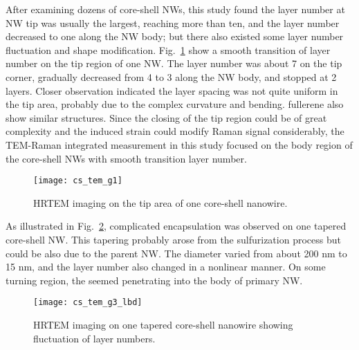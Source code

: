 After examining dozens of core-shell NWs, this study found the  layer number at NW tip was usually the largest, reaching more than ten, and the layer number decreased to one along the NW body; but there also existed some layer number fluctuation and shape modification. Fig.~\ref{fig:ch5ws2tem3} show a smooth transition of  layer number on the tip region of one NW. The layer number was about 7 on the tip corner, gradually decreased from 4 to 3 along the NW body, and stopped at 2 layers. Closer observation indicated the layer spacing was not quite uniform in the tip area, probably due to the complex curvature and bending.  fullerene also show similar structures. Since the closing of the tip region could be of great complexity and the induced strain could modify Raman signal considerably, the TEM-Raman integrated measurement in this study focused on the body region of the core-shell NWs with smooth transition layer number.
\begin{figure}[htb]
\centering
\texttt{[image: cs\_tem\_g1]}
\caption[HRTEM imaging on the tip area of one core-shell nanowire]{HRTEM imaging on the tip area of one core-shell nanowire.}
\label{fig:ch5ws2tem3}
\end{figure}
As illustrated in Fig.~\ref{fig:ch5ws2tem4}, complicated  encapsulation was observed on one tapered core-shell NW. This tapering probably arose from the sulfurization process but could be also due to the parent  NW. The diameter varied from about 200 nm to 15 nm, and the  layer number also changed in a nonlinear manner. On some turning region, the  seemed penetrating into the body of primary  NW. 
\begin{figure}[htb]
\centering
\texttt{[image: cs\_tem\_g3\_lbd]}
\caption[HRTEM imaging on one tapered core-shell nanowire showing fluctuation of layer numbers]{HRTEM imaging on one tapered core-shell nanowire showing fluctuation of layer numbers.}
\label{fig:ch5ws2tem4}
\end{figure}

